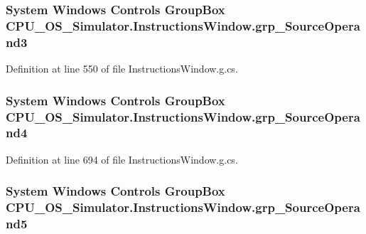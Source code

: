 \subsubsection[{grp\+\_\+\+Source\+Operand3}]{\setlength{\rightskip}{0pt plus 5cm}System Windows Controls Group\+Box C\+P\+U\+\_\+\+O\+S\+\_\+\+Simulator.\+Instructions\+Window.\+grp\+\_\+\+Source\+Operand3\hspace{0.3cm}{\ttfamily [package]}}\label{class_c_p_u___o_s___simulator_1_1_instructions_window_a59e5e9da77976ce8f2d8a43528b98f63}


Definition at line 550 of file Instructions\+Window.\+g.\+cs.

\hypertarget{class_c_p_u___o_s___simulator_1_1_instructions_window_a0efec3cdad460e3596a699716e0a24e9}{}
\subsubsection[{grp\+\_\+\+Source\+Operand4}]{\setlength{\rightskip}{0pt plus 5cm}System Windows Controls Group\+Box C\+P\+U\+\_\+\+O\+S\+\_\+\+Simulator.\+Instructions\+Window.\+grp\+\_\+\+Source\+Operand4\hspace{0.3cm}{\ttfamily [package]}}\label{class_c_p_u___o_s___simulator_1_1_instructions_window_a0efec3cdad460e3596a699716e0a24e9}


Definition at line 694 of file Instructions\+Window.\+g.\+cs.

\hypertarget{class_c_p_u___o_s___simulator_1_1_instructions_window_ab16ea5f8e2e761d0a7a0fe7054dfa3b5}{}
\subsubsection[{grp\+\_\+\+Source\+Operand5}]{\setlength{\rightskip}{0pt plus 5cm}System Windows Controls Group\+Box C\+P\+U\+\_\+\+O\+S\+\_\+\+Simulator.\+Instructions\+Window.\+grp\+\_\+\+Source\+Operand5\hspace{0.3cm}{\ttfamily [package]}}\label{class_c_p_u___o_s___simulator_1_1_instructions_window_ab16ea5f8e2e761d0a7a0fe7054dfa3b5}


